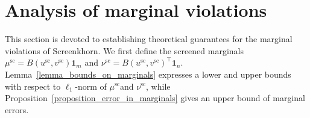 
\section{Analysis of marginal violations} %
\label{sec:analysis_of_marginal_violations}

This section is devoted to establishing theoretical guarantees for the marginal violations of Screenkhorn. 
We first define the screened marginals $\mu^{\text{sc}} = B(u^{\text{sc}}, v^{\text{sc}}) \mathbf 1_m$ and $\nu^{\text{sc}} = B(u^{\text{sc}}, v^{\text{sc}})^\top \mathbf 1_n.$ 
Lemma~\ref{lemma_bounds_on_marginals} expresses a lower and upper bounds with respect to $\ell_1$-norm of $\mu^{\text{sc}}$and $\nu^{\text{sc}}$, while Proposition~\ref{proposition_error_in_marginals} gives an upper bound of marginal errors.

